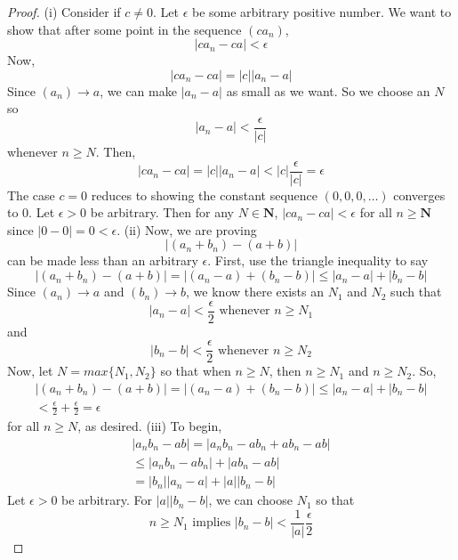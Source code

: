     \begin{proof}
        (i) Consider if $c \neq 0$. Let $\epsilon$ be some arbitrary positive number. We want to show that after some point in the sequence $(ca_n)$, 
            $$|ca_n - ca| < \epsilon$$
            Now,
            $$|ca_n - ca| = |c||a_n - a|$$
            Since $(a_n) \rightarrow a$, we can make $|a_n - a|$ as small as we want. So we choose an $N$ so
            $$|a_n - a| < \frac{\epsilon}{|c|}$$
            whenever $n \geq N$. Then, 
            $$|ca_n - ca| = |c||a_n - a| < |c|\frac{\epsilon}{|c|} = \epsilon$$
            The case $c = 0$ reduces to showing the constant sequence $(0, 0, 0, \dots)$ converges to 0. Let $\epsilon > 0$ be arbitrary. Then for any $N \in \textbf{N}$,
            $|ca_n - ca| < \epsilon$
            for all $n \geq \textbf{N}$ since $|0 - 0| = 0 < \epsilon$.
        \newline \indent
        (ii) Now, we are proving
            $$|(a_n + b_n) - (a + b)|$$
            can be made less than an arbitrary $\epsilon$. First, use the triangle inequality to say
            $$|(a_n + b_n) - (a + b)| = |(a_n - a) + (b_n - b)| \leq |a_n - a| + |b_n - b|$$
            Since $(a_n) \rightarrow a$ and $(b_n) \rightarrow b$, we know there exists an $N_1$ and $N_2$ such that 
            $$|a_n - a| < \frac{\epsilon}{2} \text{ whenever } n \geq N_1$$
            and
            $$|b_n - b| < \frac{\epsilon}{2} \text{ whenever } n \geq N_2$$
            Now, let $N = max\{N_1, N_2\}$ so that when $n \geq N$, then $n \geq N_1$ and $n \geq N_2$. So,
            \begin{align*}
                |(a_n + b_n) - (a + b)| = |(a_n - a) + (b_n - b)| \leq |a_n - a| + |b_n - b| \\
                < \frac{\epsilon}{2} + \frac{\epsilon}{2} = \epsilon
            \end{align*}
            for all $n \geq N$, as desired.
        \newline \indent
        (iii) To begin,
            \begin{align*}
                |a_nb_n - ab| = |a_nb_n - ab_n + ab_n - ab| \\
                \leq |a_nb_n - ab_n| + |ab_n - ab| \\
                = |b_n||a_n - a| + |a||b_n - b|
            \end{align*}
            Let $\epsilon > 0$ be arbitrary. For $|a||b_n - b|$, we can choose $N_1$ so that
            $$n \geq N_1 \text{ implies } |b_n - b| < \frac{1}{|a|}\frac{\epsilon}{2}$$

\end{proof}
